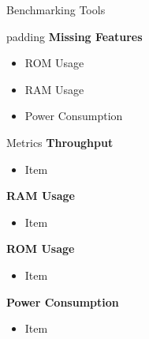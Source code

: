 \documentclass[xcolor=pdftex,dvipsnames,table,final]{beamer}
\begin{document}
\begin{frame}[fragile]{}
\begin{columns}[t, totalwidth=\textwidth]
\begin{column}{.31\linewidth}
\begin{block}{Benchmarking Tools}
        \begin{center}
        \begin{minipage}[t]{0.9\linewidth}  
        \begin{beamercolorbox}[rounded=true]{padding}
          \textbf{Missing Features}
          \begin{itemize}
            \item ROM Usage
            \item RAM Usage
            \item Power Consumption
          \end{itemize}
        \end{beamercolorbox}
        \end{minipage}
        \end{center}
      \end{block}
      \begin{block}{Metrics}
        {\large\textbf{Throughput}}
        \begin{itemize}
          \item Item 
        \end{itemize}
        {\large\textbf{RAM Usage}}
        \begin{itemize}
          \item Item 
        \end{itemize}
        {\large\textbf{ROM Usage}}
        \begin{itemize}
          \item Item 
        \end{itemize}
        {\large\textbf{Power Consumption}}
        \begin{itemize}
          \item Item 
        \end{itemize}
      \end{block}
        
    \end{column}
\begin{column}{.675\linewidth}
   \begin{columns}%
    \begin{column}{.473\linewidth}
   

\end{column}
\end{columns}
\end{column}
\end{columns}
\end{frame}
\end{document}
